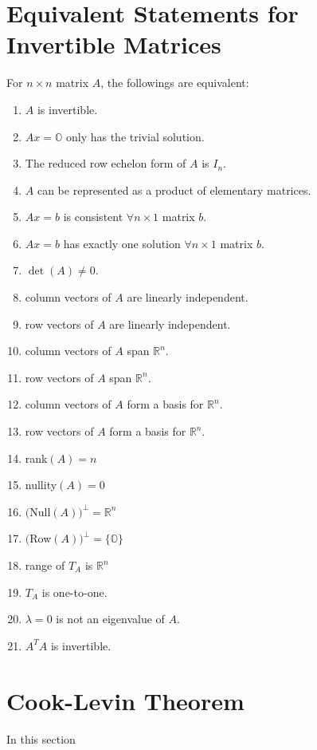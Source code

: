 

    \section{Equivalent Statements for Invertible Matrices}\label{equiv_invert}
    		For $n \times n$ matrix $A$, the followings are equivalent:
        \begin{enumerate}
        	\item $A$ is invertible.
        	\item $Ax=\mathbb{O}$ only has the trivial solution.
        	\item The reduced row echelon form of $A$ is $I_n$.
        	\item $A$ can be represented as a product of elementary matrices.
        	\item $Ax=b$ is consistent $\forall n \times 1$ matrix $b$.
        	\item $Ax=b$ has exactly one solution $\forall n \times 1$ matrix $b$.
        	\item $\det(A)\ne0$.
        	\item column vectors of $A$ are linearly independent.
        	\item row vectors of $A$ are linearly independent.
        	\item column vectors of $A$ span $\mathbb{R}^n$.
        	\item row vectors of $A$ span $\mathbb{R}^n$.
        	\item column vectors of $A$ form a basis for $\mathbb{R}^n$.
        	\item row vectors of $A$ form a basis for $\mathbb{R}^n$.
        	\item rank$(A)=n$
        	\item nullity$(A)=0$
        	\item $($Null$(A))^\perp=\mathbb{R}^n$
        	\item $($Row$(A))^\perp=\{\mathbb{O}\}$
        	\item range of $T_A$ is $\mathbb{R}^n$
        	\item $T_A$ is one-to-one.
        	\item $\lambda=0$ is not an eigenvalue of $A$.
        	\item $A^TA$ is invertible.
        \end{enumerate}
        
    \section{Cook-Levin Theorem}
        In this section
    
